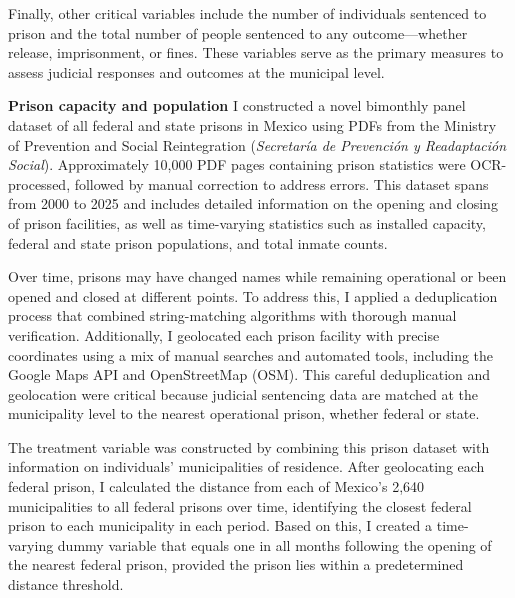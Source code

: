 Finally, other critical variables include the number of individuals sentenced to prison and the total number of people sentenced to any outcome—whether release, imprisonment, or fines. These variables serve as the primary measures to assess judicial responses and outcomes at the municipal level. 


\textbf{Prison capacity and population} I constructed a novel bimonthly panel dataset of all federal and state prisons in Mexico using PDFs from the Ministry of Prevention and Social Reintegration (\textit{Secretaría de Prevención y Readaptación Social}). Approximately 10,000 PDF pages containing prison statistics were OCR-processed, followed by manual correction to address errors. This dataset spans from 2000 to 2025 and includes detailed information on the opening and closing of prison facilities, as well as time-varying statistics such as installed capacity, federal and state prison populations, and total inmate counts.

Over time, prisons may have changed names while remaining operational or been opened and closed at different points. To address this, I applied a deduplication process that combined string-matching algorithms with thorough manual verification. Additionally, I geolocated each prison facility with precise coordinates using a mix of manual searches and automated tools, including the Google Maps API and OpenStreetMap (OSM). This careful deduplication and geolocation were critical because judicial sentencing data are matched at the municipality level to the nearest operational prison, whether federal or state.

The treatment variable was constructed by combining this prison dataset with information on individuals’ municipalities of residence. After geolocating each federal prison, I calculated the distance from each of Mexico’s 2,640 municipalities to all federal prisons over time, identifying the closest federal prison to each municipality in each period. Based on this, I created a time-varying dummy variable that equals one in all months following the opening of the nearest federal prison, provided the prison lies within a predetermined distance threshold.

